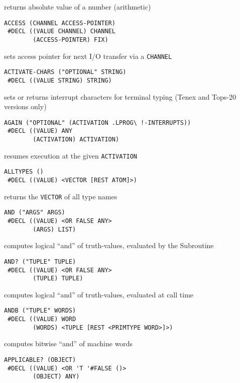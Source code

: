 \documentclass[a4paper,]{article}
\begin{document}
returns absolute value of a number (arithmetic)

\begin{verbatim}
ACCESS (CHANNEL ACCESS-POINTER)
 #DECL ((VALUE CHANNEL) CHANNEL
        (ACCESS-POINTER) FIX)
\end{verbatim}

sets access pointer for next I/O transfer via a \texttt{CHANNEL}

\begin{verbatim}
ACTIVATE-CHARS ("OPTIONAL" STRING)
 #DECL ((VALUE STRING) STRING)
\end{verbatim}

sets or returns interrupt characters for terminal typing (Tenex and Tops-20
versions only)

\begin{verbatim}
AGAIN ("OPTIONAL" (ACTIVATION .LPROG\ !-INTERRUPTS))
 #DECL ((VALUE) ANY
        (ACTIVATION) ACTIVATION)
\end{verbatim}

resumes execution at the given \texttt{ACTIVATION}

\begin{verbatim}
ALLTYPES ()
 #DECL ((VALUE) <VECTOR [REST ATOM]>)
\end{verbatim}

returns the \texttt{VECTOR} of all type names

\begin{verbatim}
AND ("ARGS" ARGS)
 #DECL ((VALUE) <OR FALSE ANY>
        (ARGS) LIST)
\end{verbatim}

computes logical ``and'' of truth-values, evaluated by the Subroutine

\begin{verbatim}
AND? ("TUPLE" TUPLE)
 #DECL ((VALUE) <OR FALSE ANY>
        (TUPLE) TUPLE)
\end{verbatim}

computes logical ``and'' of truth-values, evaluated at call time

\begin{verbatim}
ANDB ("TUPLE" WORDS)
 #DECL ((VALUE) WORD
        (WORDS) <TUPLE [REST <PRIMTYPE WORD>]>)
\end{verbatim}

computes bitwise ``and'' of machine words

\begin{verbatim}
APPLICABLE? (OBJECT)
 #DECL ((VALUE) <OR 'T '#FALSE ()>
        (OBJECT) ANY)
\end{verbatim}
\end{document}
